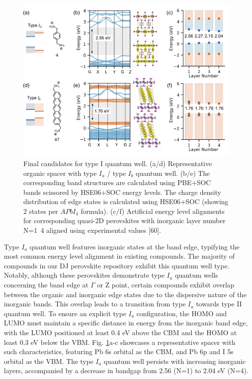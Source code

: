 \begin{figure}[!ht]
\centering
\includegraphics[width=\textwidth]{figures/high-throughput-calculation/figure5.pdf}
\caption[Final candidates for type I quantum well.]{Final candidates for type I quantum well. (a/d) Representative organic spacer with type $I_a$ / type $I_b$ quantum well. (b/e) The corresponding band structures are calculated using PBE+SOC bands scissored by HSE06+SOC energy levels. The charge density distribution of edge states is calculated using HSE06+SOC (showing 2 states per $APbI_4$ formula).  (c/f) Artificial energy level alignments for corresponding quasi-2D perovskites with inorganic layer number N=1~4 aligned using experimental values [60].  }
\label{f:fig5}
\end{figure}

Type $I_a$ quantum well features inorganic states at the band edge, typifying the most common energy level alignment in existing compounds. The majority of compounds in our DJ perovskite repository exhibit this quantum well type. Notably, although these perovskites demonstrate type $I_a$ quantum wells concerning the band edge at $\Gamma$ or Z point, certain compounds exhibit overlap between the organic and inorganic edge states due to the dispersive nature of the inorganic bands. This overlap leads to a transition from type $I_a$ towards type II quantum well. To ensure an explicit type $I_a$ configuration, the HOMO and LUMO must maintain a specific distance in energy from the inorganic band edge, with the LUMO positioned at least 0.4 eV above the CBM and the HOMO at least 0.3 eV below the VBM. Fig. \ref{f:fig5}a-c showcases a representative spacer with such characteristics, featuring Pb 6s orbital as the CBM, and Pb 6p and I 5s orbital as the VBM. The type $I_a$ quantum well persists with increasing inorganic layers, accompanied by a decrease in bandgap from 2.56 (N=1) to 2.04 eV (N=4).

